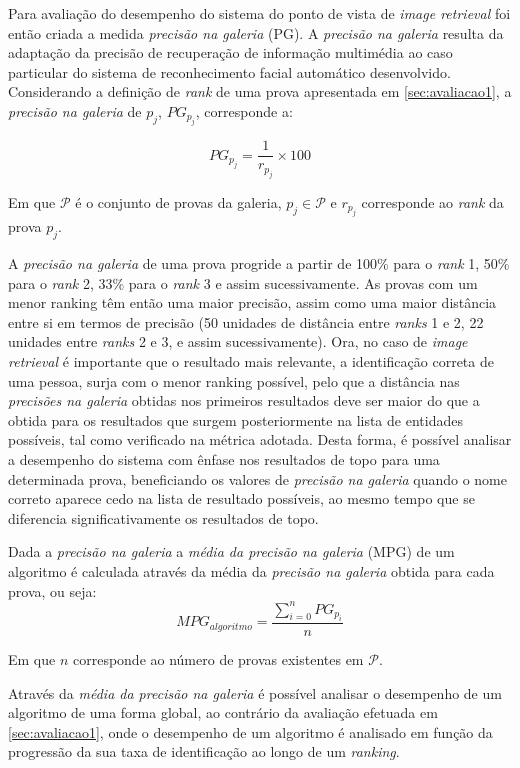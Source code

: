 Para avaliação do desempenho do sistema do ponto de vista de \textit{image retrieval} foi então criada a medida \textit{precisão na galeria} (PG). A \textit{precisão na galeria} resulta da adaptação da precisão de recuperação de informação multimédia ao caso particular do sistema de reconhecimento facial automático desenvolvido. Considerando a definição de \textit{rank} de uma prova apresentada em \ref{sec:avaliacao1}, a \textit{precisão na galeria} de $p_j$, $PG_{p_j}$, corresponde a:

\begin{equation}
PG_{p_j} = \frac{1}{r_{p_j}} \times 100
\end{equation}

Em que $\mathscr{P}$ é o conjunto de provas da galeria, $p_j \in \mathscr{P}$ e $r_{p_j}$ corresponde ao \textit{rank} da prova $p_j$.

A \textit{precisão na galeria} de uma prova progride a partir de 100\% para o \textit{rank} 1, 50\% para o \textit{rank} 2, 33\% para o \textit{rank} 3 e assim sucessivamente. As provas com um menor ranking têm então uma maior precisão, assim como uma maior distância entre si em termos de precisão (50 unidades de distância entre \textit{ranks} 1 e 2, 22 unidades entre \textit{ranks} 2 e 3, e assim sucessivamente). Ora, no caso de \textit{image retrieval} é importante que o resultado mais relevante, a identificação correta de uma pessoa, surja com o menor ranking possível, pelo que a distância nas \textit{precisões na galeria} obtidas nos primeiros resultados deve ser maior do que a obtida para os resultados que surgem posteriormente na lista de entidades possíveis, tal como verificado na métrica adotada. Desta forma, é possível analisar a desempenho do sistema com ênfase nos resultados de topo para uma determinada prova, beneficiando os valores de \textit{precisão na galeria} quando o nome correto aparece cedo na lista de resultado possíveis, ao mesmo tempo que se diferencia significativamente os resultados de topo.

Dada a \textit{precisão na galeria} a \textit{média da precisão na galeria} (MPG) de um algoritmo é calculada através da média da \textit{precisão na galeria} obtida para cada prova, ou seja:
\begin{equation}
MPG_{algoritmo} = \frac{ \sum\limits_{i=0}^{n} PG_{p_i} }{n}
\end{equation}

Em que $n$ corresponde ao número de provas existentes em $\mathscr{P}$.

Através da \textit{média da precisão na galeria} é possível analisar o desempenho de um algoritmo de uma forma global, ao contrário da avaliação efetuada em  \ref{sec:avaliacao1}, onde o desempenho de um algoritmo é analisado em função da progressão da sua taxa de identificação ao longo de um \textit{ranking}.

